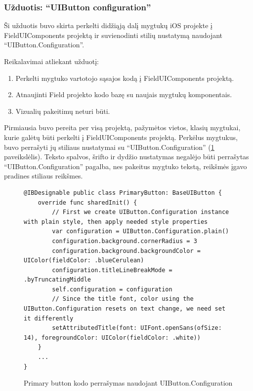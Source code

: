 \subsubsection{Užduotis: \enquote{UIButton configuration}}
Ši užduotis buvo skirta perkelti didžiąją dalį mygtukų iOS projekte į FieldUIComponents projektą ir suvienodinti stilių nustatymą naudojant \enquote{UIButton.Configuration}.

Reikalavimai atliekant užduotį:
\begin{enumerate}
    \item Perkelti mygtuko vartotojo sąsajos kodą į FieldUIComponents projektą.
    \item Atnaujinti Field projekto kodo bazę su naujais mygtukų komponentais.
    \item Vizualių pakeitimų neturi būti.
\end{enumerate}

Pirmiausia buvo pereita per visą projektą, pažymėtos vietos, klasių mygtukai, kurie galėtų būti perkelti į FieldUIComponents projektą. Perkėlus mygtukus, buvo perrašyti jų stiliaus nustatymai su \enquote{UIButton.Configuration} (\ref{fig:Primary button} paveikslėlis). Teksto spalvos, šrifto ir dydžio nustatymas negalėjo būti perrašytas \enquote{UIButton.Configuration} pagalba, nes pakeitus mygtuko tekstą, reikšmės įgavo pradines stiliaus reikšmes. 

\begin{figure}[htbp!]
    \centering
    \begin{verbatim}
@IBDesignable public class PrimaryButton: BaseUIButton {
    override func sharedInit() {
        // First we create UIButton.Configuration instance with plain style, then apply needed style properties
        var configuration = UIButton.Configuration.plain()
        configuration.background.cornerRadius = 3
        configuration.background.backgroundColor = UIColor(fieldColor: .blueCerulean)
        configuration.titleLineBreakMode = .byTruncatingMiddle
        self.configuration = configuration
        // Since the title font, color using the UIButton.Configuration resets on text change, we need set it differently
        setAttributedTitle(font: UIFont.openSans(ofSize: 14), foregroundColor: UIColor(fieldColor: .white))
    }
    ...
}
    \end{verbatim}
    \caption{Primary button kodo perrašymas naudojant UIButton.Configuration}
    \label{fig:Primary button}
\end{figure}


